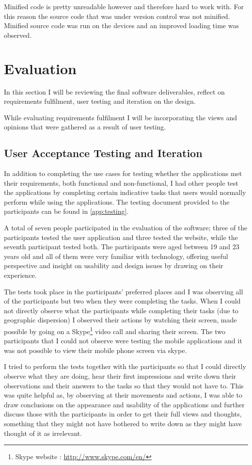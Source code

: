 \documentclass[12pt]{ecsproject}     %
\begin{document}
Minified code is pretty unreadable however and therefore hard to work with. For this reason the source code that was under version control was not minified. Minified source code was run on the devices and an improved loading time was observed.

\chapter{Evaluation}
\label{chap:eval}
In this section I will be reviewing the final software deliverables, reflect on requirements fulfilment, user testing and iteration on the design.

While evaluating requirements fulfilment I will be incorporating the views and opinions that were gathered as a result of user testing.

\section{User Acceptance Testing and Iteration}
\label{sec:usertest}
In addition to completing the use cases for testing whether the applications met their requirements, both functional and non-functional, I had other people test the applications by completing certain indicative tasks that users would normally perform while using the applications. The testing document provided to the participants can be found in \ref{app:testing}.

A total of seven people participated in the evaluation of the software; three of the participants tested the user application and three tested the website, while the seventh participant tested both. The participants were aged between 19 and 23 years old and all of them were very familiar with technology, offering useful perspective and insight on usability and design issues by drawing on their experience.

The tests took place in the participants' preferred places and I was observing all of the participants but two when they were completing the tasks. When I could not directly observe what the participants while completing their tasks (due to geographic dispersion) I observed their actions by watching their screen, made possible by going on a Skype\footnote{Skype website : \href{http://www.skype.com/en/}{http://www.skype.com/en/}} video call and sharing their screen. The two participants that I could not observe were testing the mobile applications and it was not possible to view their mobile phone screen via skype.

I tried to perform the tests together with the participants so that I could directly observe what they are doing, hear their first impressions and write down their observations and their answers to the tasks so that they would not have to. This was quite helpful as, by observing at their movements and actions, I was able to draw conclusions on the appearance and usability of the applications and further discuss those with the participants in order to get their full views and thoughts, something that they might not have bothered to write down as they might have thought of it as irrelevant.
\end{document}
